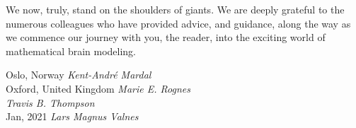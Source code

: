We now, truly, stand on the shoulders of giants.  We are deeply grateful to the 
numerous colleagues who have provided advice, and guidance, along the way as we 
commence our journey with you, the reader, into the exciting world of mathematical 
brain modeling. 




 

\vspace{\baselineskip}
\begin{flushright}\noindent
Oslo, Norway \hfill {\it Kent-Andr\'e Mardal}\\ 
Oxford, United Kingdom   \hfill {\it Marie E. Rognes}\\ 
             \hfill {\it Travis B. Thompson}\\ 
Jan, 2021    \hfill {\it Lars Magnus Valnes}\\ 
\end{flushright}



